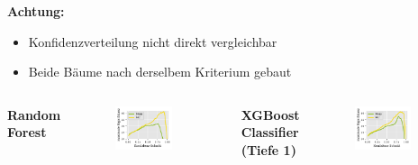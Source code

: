 \documentclass[aspectratio=1610, professionalfonts, 9pt]{beamer}
\begin{document}
\begin{frame}
  \Large \bf Achtung:
  \begin{itemize}
	\item Konfidenzverteilung nicht direkt vergleichbar
	\item Beide Bäume nach derselbem Kriterium gebaut
  \end{itemize}
  \begin{columns}
	\Large \bf Random Forest
	\begin{figure}
	  \centering
	  \includegraphics[width=0.8\textwidth]{./Plots/sig_mess_tree.pdf}
	\end{figure}
	\Large \bf XGBoost Classifier (Tiefe 1)
	\begin{figure}
	  \centering
	  \includegraphics[width=0.8\textwidth]{./Plots/sig_mess_xgbc.pdf}
	\end{figure}
  \end{columns}
\end{frame}
\end{document}
